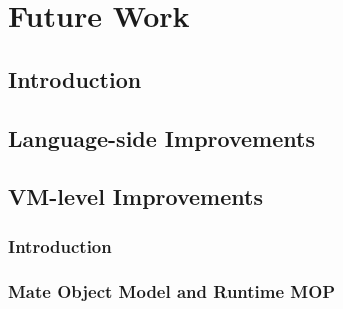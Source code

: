 
\chapter{Future Work}
\minitoc

\section{Introduction}


\section{Language-side Improvements}


\section{VM-level Improvements}


\subsection{Introduction}

\subsection{Mate Object Model and Runtime MOP}

